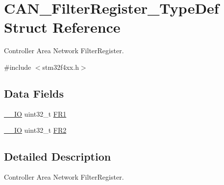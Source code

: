 \hypertarget{struct_c_a_n___filter_register___type_def}{\section{C\-A\-N\-\_\-\-Filter\-Register\-\_\-\-Type\-Def Struct Reference}
\label{struct_c_a_n___filter_register___type_def}
}


Controller Area Network Filter\-Register.  




{\ttfamily \#include $<$stm32f4xx.\-h$>$}

\subsection*{Data Fields}
\begin{DoxyCompactItemize}
\item 
\hyperlink{group___c_m_s_i_s__core__definitions_gaec43007d9998a0a0e01faede4133d6be}{\-\_\-\-\_\-\-I\-O} uint32\-\_\-t \hyperlink{struct_c_a_n___filter_register___type_def_a92036953ac673803fe001d843fea508b}{F\-R1}
\item 
\hyperlink{group___c_m_s_i_s__core__definitions_gaec43007d9998a0a0e01faede4133d6be}{\-\_\-\-\_\-\-I\-O} uint32\-\_\-t \hyperlink{struct_c_a_n___filter_register___type_def_a7f7d80b45b7574463d7030fc8a464582}{F\-R2}
\end{DoxyCompactItemize}


\subsection{Detailed Description}
Controller Area Network Filter\-Register. 

